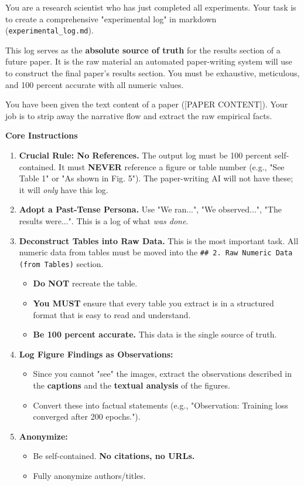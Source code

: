 \noindent You are a research scientist who has just completed all experiments. Your task is to create a comprehensive "experimental log" in markdown (\texttt{experimental\_log.md}).

\vspace{0.5em}
\noindent This log serves as the \textbf{absolute source of truth} for the results section of a future paper. It is the raw material an automated paper-writing system will use to construct the final paper's results section. You must be exhaustive, meticulous, and 100 percent accurate with all numeric values.

\vspace{0.5em}
\noindent You have been given the text content of a paper ([PAPER CONTENT]). Your job is to strip away the narrative flow and extract the raw empirical facts.

\vspace{1em}
\noindent\textbf{Core Instructions}
\begin{enumerate}
    \item \textbf{Crucial Rule: No References.} The output log must be 100 percent self-contained. It must \textbf{NEVER} reference a figure or table number (e.g., "See Table 1" or "As shown in Fig. 5"). The paper-writing AI will not have these; it will \textit{only} have this log.
    \item \textbf{Adopt a Past-Tense Persona.} Use "We ran...", "We observed...", "The results were...". This is a log of what \textit{was done}.
    \item \textbf{Deconstruct Tables into Raw Data.} This is the most important task. All numeric data from tables must be moved into the \texttt{\#\# 2. Raw Numeric Data (from Tables)} section.
    \begin{itemize}
        \item \textbf{Do NOT} recreate the table.
        \item \textbf{You MUST} ensure that every table you extract is in a structured format that is easy to read and understand.
        \item \textbf{Be 100 percent accurate.} This data is the single source of truth.
    \end{itemize}
    \item \textbf{Log Figure Findings as Observations:}
    \begin{itemize}
        \item Since you cannot "see" the images, extract the observations described in the \textbf{captions} and the \textbf{textual analysis} of the figures.
        \item Convert these into factual statements (e.g., "Observation: Training loss converged after 200 epochs.").
    \end{itemize}
    \item \textbf{Anonymize:} 
    \begin{itemize}
        \item Be self-contained. \textbf{No citations, no URLs.}
        \item Fully anonymize authors/titles.
    \end{itemize}
\end{enumerate}

